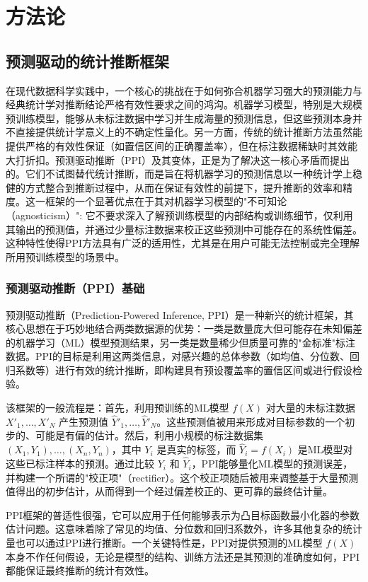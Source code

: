 \documentclass[12pt,a4paper]{article}
\begin{document}
\section{方法论}
\label{sec:methodology}

\subsection{预测驱动的统计推断框架}
\label{sec:ppi_framework}
\indent 在现代数据科学实践中，一个核心的挑战在于如何弥合机器学习强大的预测能力与经典统计学对推断结论严格有效性要求之间的鸿沟。机器学习模型，特别是大规模预训练模型，能够从未标注数据中学习并生成海量的预测信息，但这些预测本身并不直接提供统计学意义上的不确定性量化。另一方面，传统的统计推断方法虽然能提供严格的有效性保证（如置信区间的正确覆盖率），但在标注数据稀缺时其效能大打折扣。预测驱动推断（PPI）及其变体，正是为了解决这一核心矛盾而提出的。它们不试图替代统计推断，而是旨在将机器学习的预测信息以一种统计学上稳健的方式整合到推断过程中，从而在保证有效性的前提下，提升推断的效率和精度。这一框架的一个显著优点在于其对机器学习模型的"不可知论（agnosticism）": 它不要求深入了解预训练模型的内部结构或训练细节，仅利用其输出的预测值，并通过少量标注数据来校正这些预测中可能存在的系统性偏差。这种特性使得PPI方法具有广泛的适用性，尤其是在用户可能无法控制或完全理解所用预训练模型的场景中。

\subsubsection{预测驱动推断（PPI）基础}
\label{sec:ppi_basics}
\indent 预测驱动推断（Prediction-Powered Inference, PPI）是一种新兴的统计框架，其核心思想在于巧妙地结合两类数据源的优势：一类是数量庞大但可能存在未知偏差的机器学习（ML）模型预测结果，另一类是数量稀少但质量可靠的"金标准"标注数据。PPI的目标是利用这两类信息，对感兴趣的总体参数（如均值、分位数、回归系数等）进行有效的统计推断，即构建具有预设覆盖率的置信区间或进行假设检验。

该框架的一般流程是：首先，利用预训练的ML模型 $f(X)$ 对大量的未标注数据 $X'_1, \dots, X'_N$ 产生预测值 $\hat{Y}'_1, \dots, \hat{Y}'_N$。这些预测值被用来形成对目标参数的一个初步的、可能是有偏的估计。然后，利用小规模的标注数据集 $(X_1,Y_1), \dots, (X_n,Y_n)$，其中 $Y_i$ 是真实的标签，而 $\hat{Y}_i=f(X_i)$ 是ML模型对这些已标注样本的预测。通过比较 $Y_i$ 和 $\hat{Y}_i$，PPI能够量化ML模型的预测误差，并构建一个所谓的"校正项"（rectifier）。这个校正项随后被用来调整基于大量预测值得出的初步估计，从而得到一个经过偏差校正的、更可靠的最终估计量。

PPI框架的普适性很强，它可以应用于任何能够表示为凸目标函数最小化器的参数估计问题。这意味着除了常见的均值、分位数和回归系数外，许多其他复杂的统计量也可以通过PPI进行推断。一个关键特性是，PPI对提供预测的ML模型 $f(X)$ 本身不作任何假设，无论是模型的结构、训练方法还是其预测的准确度如何，PPI都能保证最终推断的统计有效性。
\end{document}
